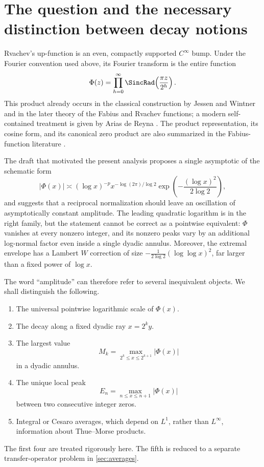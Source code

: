 \documentclass[11pt,oneside]{article}
\theoremstyle{definition}
\theoremstyle{remark}
\newcommand{\PhiF}{\Phi}
\begin{document}
\tableofcontents
\newpage

\section{The question and the necessary distinction between decay notions}
\label{sec:introduction}

Rvachev's up-function is an even, compactly supported \(C^\infty\) bump.
Under the Fourier convention used above, its Fourier transform is the entire
function
\begin{equation}
 \PhiF(z)=\prod_{h=0}^{\infty}
 \SincRad\!\left(\frac{\pi z}{2^h}\right).
 \label{eq:Phi-definition}
\end{equation}
This product already occurs in the classical construction by Jessen and
Wintner and in the later theory of the Fabius and Rvachev functions; a modern
self-contained treatment is given by Arias de Reyna \cite{arias2017}.  The
product representation, its cosine form, and its canonical zero product are
also summarized in the Fabius-function literature \cite{wikipediaFabius}.

The draft that motivated the present analysis \cite{proveitDraft} proposes a
single asymptotic of the schematic form
\[
 |\PhiF(x)|\asymp
 (\log x)^{-p}x^{-\log(2\pi)/\log 2}
 \exp\!\left(-\frac{(\log x)^2}{2\log2}\right),
\]
and suggests that a reciprocal normalization should leave an oscillation of
asymptotically constant amplitude.  The leading quadratic logarithm is in the
right family, but the statement cannot be correct as a pointwise equivalent:
\(\PhiF\) vanishes at every nonzero integer, and its nonzero peaks vary by an
additional log-normal factor even inside a single dyadic annulus.  Moreover,
the extremal envelope has a Lambert \(W\) correction of size
\(-\tfrac1{2\log2}(\log\log x)^2\), far larger than a fixed power of
\(\log x\).

The word ``amplitude'' can therefore refer to several inequivalent objects.
We shall distinguish the following.
\begin{enumerate}
 \item The universal pointwise logarithmic scale of \(\PhiF(x)\).
 \item The decay along a fixed dyadic ray \(x=2^k y\).
 \item The largest value
 \[
   M_k=\max_{2^k\le x\le 2^{k+1}}|\PhiF(x)|
 \]
 in a dyadic annulus.
 \item The unique local peak
 \[
   E_n=\max_{n\le x\le n+1}|\PhiF(x)|
 \]
 between two consecutive integer zeros.
 \item Integral or Cesaro averages, which depend on \(L^1\), rather than
 \(L^\infty\), information about Thue--Morse products.
\end{enumerate}
The first four are treated rigorously here.  The fifth is reduced to a
separate transfer-operator problem in \cref{sec:averages}.
\end{document}
